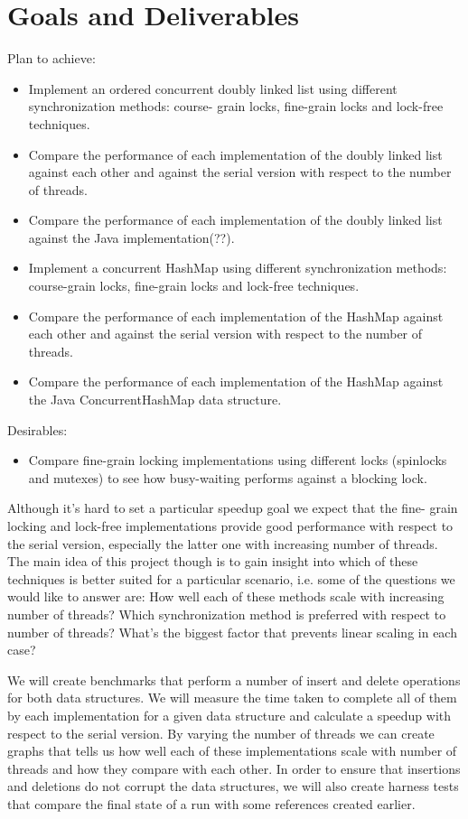 \documentclass[11pt]{article}
\begin{document}
\section*{Goals and Deliverables}  
Plan to achieve: 
\begin{itemize} 
\item
Implement an ordered concurrent doubly linked list using different
synchronization methods: course- grain locks, fine-grain locks and lock-free
techniques. 
\item Compare the performance of each implementation of the doubly
linked list against each other and against the serial version with respect to
the number of threads. 
\item Compare the performance of each implementation of
the doubly linked list against the Java implementation(??). 
\item Implement a
concurrent HashMap using different synchronization methods: course-grain locks,
fine-grain locks  and lock-free techniques. 
\item Compare the performance of
each implementation of the HashMap against each other and against the serial
version with respect to the number of threads. 
\item Compare the performance of
each implementation of the HashMap against the Java ConcurrentHashMap data
structure.
\end{itemize}

Desirables: 
\begin{itemize}
\item
Compare fine-grain locking implementations using different locks
(spinlocks and mutexes) to see how busy-waiting performs against a blocking
lock.
\end{itemize}

Although it’s hard to set a particular speedup goal we expect that the fine-
grain locking and lock-free implementations provide good performance with
respect to the serial version, especially the latter one with increasing number
of threads. The main idea of this project though is to gain insight into which
of these techniques is better suited for a particular scenario, i.e. some of the
questions we would like to answer are: How well each of these methods scale with
increasing number of threads? Which synchronization method is preferred with
respect to number of threads? What’s the biggest factor that prevents linear
scaling in each case?

We will create benchmarks that perform a number of insert and delete operations
for both data structures. We will measure the time taken to complete all of them
by each implementation for a given data structure and calculate a speedup with
respect to the serial version. By varying the number of threads we can create
graphs that tells us how well each of these implementations scale with number of
threads and how they compare with each other. In order to ensure that insertions
and deletions do not corrupt the data structures, we will also create harness
tests that compare the final state of a run with some references created
earlier.
\end{document}

